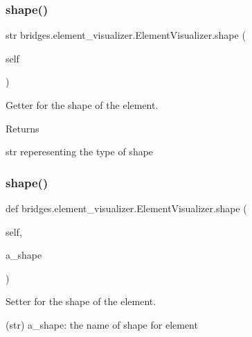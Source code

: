 \subsubsection{\texorpdfstring{shape()}{shape()}\hspace{0.1cm}{\footnotesize\ttfamily [1/2]}}
{\footnotesize\ttfamily  str bridges.\+element\+\_\+visualizer.\+Element\+Visualizer.\+shape (\begin{DoxyParamCaption}\item[{}]{self }\end{DoxyParamCaption})}



Getter for the shape of the element. 

\begin{DoxyReturn}{Returns}


str reperesenting the type of shape 
\end{DoxyReturn}
\mbox{\label{classbridges_1_1element__visualizer_1_1_element_visualizer_af4bd377b8fb9a35c10740de7ea8c5eee}} 
\subsubsection{\texorpdfstring{shape()}{shape()}\hspace{0.1cm}{\footnotesize\ttfamily [2/2]}}
{\footnotesize\ttfamily def bridges.\+element\+\_\+visualizer.\+Element\+Visualizer.\+shape (\begin{DoxyParamCaption}\item[{}]{self,  }\item[{}]{a\+\_\+shape }\end{DoxyParamCaption})}



Setter for the shape of the element. 

\begin{DoxyVerb}       (str) a_shape: the name of shape for element
\end{DoxyVerb}
 \mbox{\label{classbridges_1_1element__visualizer_1_1_element_visualizer_a4719523d913d90fc35aaa96bea674e65}} 
